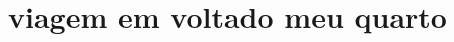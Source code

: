 \documentclass[10pt]{hedrabook}
\begin{document}
\hedratoc

\fontsize{10.65pt}{\baselineskip}\selectfont


\part[Viagem em volta do meu quarto]{viagem em volta\break do meu quarto} 




\ifdefined\printcheck\printcheck\fi
\end{document}
